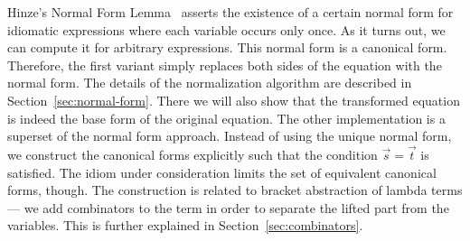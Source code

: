 Hinze's Normal Form Lemma~\cite[7]{hinze10} asserts the existence of a certain
normal form for idiomatic expressions where each variable occurs only once.
As it turns out, we can compute it for arbitrary expressions.
This normal form is a canonical form.
Therefore, the first variant simply replaces both sides of the equation with
the normal form.
The details of the normalization algorithm are described in
Section~\ref{sec:normal-form}.
There we will also show that the transformed equation is indeed the base form
of the original equation.
The other implementation is a superset of the normal form approach.
Instead of using the unique normal form, we construct the canonical forms
explicitly such that the condition $\vec s = \vec t$ is satisfied.
The idiom under consideration limits the set of equivalent canonical forms,
though.
The construction is related to bracket abstraction of lambda terms---%
we add combinators to the term in order to separate the lifted part from
the variables.
This is further explained in Section~\ref{sec:combinators}.
